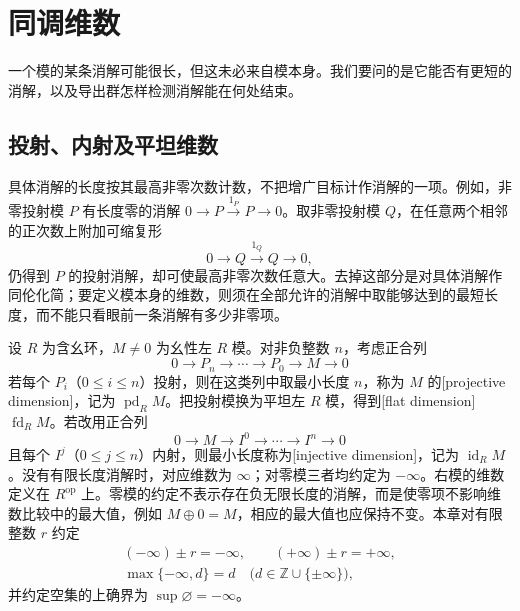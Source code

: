 
\section{同调维数}
\label{b4:sec:1001}

一个模的某条消解可能很长，但这未必来自模本身。我们要问的是它能否有更短的消解，以及导出群怎样检测消解能在何处结束。

%
%

\subsection{投射、内射及平坦维数}
\label{b4:subsec:1001:01}

具体消解的长度按其最高非零次数计数，不把增广目标计作消解的一项。例如，非零投射模 \(P\) 有长度零的消解 \(0\to P\xrightarrow{1_P}P\to0\)。取非零投射模 \(Q\)，在任意两个相邻的正次数上附加可缩复形
\[
	0\longrightarrow Q\xrightarrow{1_Q}Q\longrightarrow0,
\]
仍得到 \(P\) 的投射消解，却可使最高非零次数任意大。去掉这部分是对具体消解作同伦化简；要定义模本身的维数，则须在全部允许的消解中取能够达到的最短长度，而不能只看眼前一条消解有多少非零项。

\begin{definition}\label{b4:def:homological-dimensions}
	设 \(R\) 为含幺环，\(M\ne0\) 为幺性左 \(R\) 模。对非负整数 \(n\)，考虑正合列
	\[
		0\longrightarrow P_n\longrightarrow\cdots\longrightarrow P_0 \longrightarrow M\longrightarrow0
	\]
	若每个 \(P_i\)（\(0\le i\le n\)）投射，则在这类列中取最小长度 \(n\)，称为 \(M\) 的[projective dimension]，记为 \(\operatorname{pd}_RM\)。把投射模换为平坦左 \(R\) 模，得到[flat dimension] \(\operatorname{fd}_RM\)。若改用正合列
	\[
		0\longrightarrow M\longrightarrow I^0\longrightarrow\cdots\longrightarrow I^n\longrightarrow0
	\]
	且每个 \(I^j\)（\(0\le j\le n\)）内射，则最小长度称为[injective dimension]，记为 \(\operatorname{id}_RM\)。没有有限长度消解时，对应维数为 \(\infty\)；对零模三者均约定为 \(-\infty\)。右模的维数定义在 \(R^{\mathrm{op}}\) 上。零模的约定不表示存在负无限长度的消解，而是使零项不影响维数比较中的最大值，例如 \(M\oplus0=M\)，相应的最大值也应保持不变。本章对有限整数 \(r\) 约定
	\[
		\begin{gathered}
			(-\infty)\pm r=-\infty,\qquad (+\infty)\pm r=+\infty,
			\\
			\max\{-\infty,d\}=d \quad\bigl(d\in\mathbb Z\cup\{\pm\infty\}\bigr),
		\end{gathered}
	\]
	并约定空集的上确界为 \(\sup\varnothing=-\infty\)。
\end{definition}

